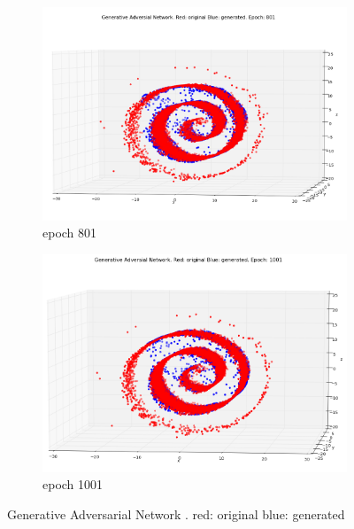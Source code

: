 \begin{figure}
\begin{subfigure}[t]{.4\textwidth}
\centering
\includegraphics[width=\linewidth]{GANResults/Both801.png}
\caption{epoch 801}
\end{subfigure}%
\begin{subfigure}[t]{.4\textwidth}
\centering
\includegraphics[width=\linewidth]{GANResults/Both1001.png}
\caption{epoch 1001}
\end{subfigure}
\caption{Generative Adversarial Network . red: original blue: generated}
\label{GANBoth}
\end{figure}



